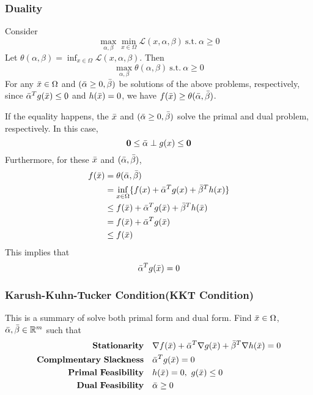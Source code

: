 \documentclass[../main.tex]{subfiles}
\begin{document}
            \subsubsection{Duality}
                Consider
                \[
                    \max_{\alpha,\beta}\min_{x\in\Omega}\mathcal{L}(x,\alpha,\beta) \mathrm{~s.t.~}\alpha\geq0
                \]
                Let $\theta(\alpha,\beta)=\inf_{x\in\Omega}\mathcal{L}(x,\alpha,\beta)$. Then
                \[
                    \max_{\alpha,\beta}\theta(\alpha,\beta)\mathrm{~s.t.~}\alpha\geq 0
                \]
                For any $\Bar{x}\in\Omega$ and $(\Bar{\alpha}\geq0,\Bar{\beta})$ be solutions of the above problems, respectively, since $\Bar{\alpha}^T g(\Bar{x})\leq 0$ and $h(\Bar{x})=0$, we have $f(\Bar{x})\geq \theta(\Bar{\alpha},\Bar{\beta})$. 
                \begin{theorem}
                    If the equality happens, the $\Bar{x}$ and $(\Bar{\alpha}\geq 0, \Bar{\beta})$ solve the primal and dual problem, respectively. In this case,
                    \[
                        \mathbf{0}\leq \Bar{\alpha} \perp g(x)\leq\mathbf{0}
                    \]
                    Furthermore, for these $\Bar{x}$ and $(\Bar{\alpha}, \Bar{\beta})$,
                    \begin{align*}
                        f(\Bar{x}) &= \theta(\Bar{\alpha},\Bar{\beta})\\
                                   &= \inf_{x \in \Omega}\{f(x) + \Bar{\alpha}^T g(x) + \Bar{\beta}^T h(x)\}\\
                                   &\leq f(\Bar{x}) + \Bar{\alpha}^T g(\Bar{x}) + \Bar{\beta}^T h(\Bar{x})\\
                                   &= f(\Bar{x}) + \Bar{\alpha}^T g(\Bar{x})\\
                                   &\leq f(\Bar{x})
                    \end{align*}
                    This implies that 
                    \[
                        \Bar{\alpha}^T g(\Bar{x}) = 0
                    \]
                \end{theorem}
            
            \subsubsection{Karush-Kuhn-Tucker Condition(KKT Condition)}
                This is a summary of solve both primal form and dual form. Find $\Bar{x}\in\Omega$, $\Bar{\alpha},\Bar{\beta}\in\mathbb{R}^m$ such that
                \begin{align*}
                    \mathbf{Stationarity \quad} & \nabla f(\Bar{x}) + \Bar{\alpha}^T\nabla g(\Bar{x}) + \Bar{\beta}^T\nabla h(\Bar{x})=0\\
                    \mathbf{Complmentary~Slackness \quad} & \Bar{\alpha}^T g(\Bar{x})=0\\
                    \mathbf{Primal~Feasibility \quad} & h(\Bar{x})=0,~g(\Bar{x})\leq 0\\
                    \mathbf{Dual~Feasibility \quad} & \Bar{\alpha}\geq 0
                \end{align*}
                
\end{document}
